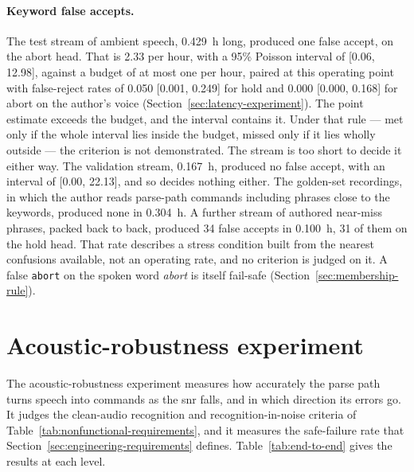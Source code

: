 \paragraph{Keyword false accepts.} The test stream of ambient speech, 0.429~h long, produced one
false accept, on the abort head. That is 2.33 per hour, with a 95\% Poisson interval of [0.06,
12.98], against a budget of at most one per hour, paired at this operating point with false-reject
rates of 0.050 [0.001, 0.249] for hold and 0.000 [0.000, 0.168] for abort on the author's voice
(Section~\ref{sec:latency-experiment}). The point estimate exceeds the budget, and the interval
contains it. Under that rule --- met only if the whole interval lies inside the budget, missed only
if it lies wholly outside --- the criterion is not demonstrated. The stream is too short to decide
it either way. The validation stream, 0.167~h, produced no false accept, with an interval of [0.00,
22.13], and so decides nothing either. The golden-set recordings, in which the author reads
parse-path commands including phrases close to the keywords, produced none in 0.304~h. A further
stream of authored near-miss phrases, packed back to back, produced 34 false accepts in 0.100~h, 31
of them on the hold head. That rate describes a stress condition built from the nearest confusions
available, not an operating rate, and no criterion is judged on it. A false \texttt{abort} on the
spoken word \emph{abort} is itself fail-safe (Section~\ref{sec:membership-rule}).

\section{Acoustic-robustness experiment}
\label{sec:acoustic-robustness}
The acoustic-robustness experiment measures how accurately the parse path turns speech into
commands as the \gls{snr} falls, and in which direction its errors go. It judges the
clean-audio recognition and recognition-in-noise criteria of
Table~\ref{tab:nonfunctional-requirements}, and it measures the safe-failure rate that
Section~\ref{sec:engineering-requirements} defines. Table~\ref{tab:end-to-end} gives the results
at each level.

